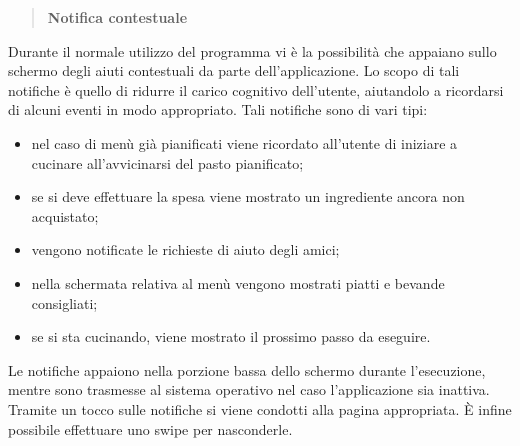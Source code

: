 \begin{quote}
 \textbf{Notifica contestuale}
\end{quote}
Durante il normale utilizzo del programma vi è la possibilità che appaiano sullo schermo degli aiuti contestuali da parte dell'applicazione.
Lo scopo di tali notifiche è quello di ridurre il carico cognitivo dell'utente, aiutandolo a ricordarsi di alcuni eventi in modo appropriato.
Tali notifiche sono di vari tipi: 
\begin{itemize}
 \item nel caso di menù già pianificati viene ricordato all'utente di iniziare a
	 cucinare all'avvicinarsi del pasto pianificato;
 \item se si deve effettuare la spesa viene mostrato un ingrediente ancora non acquistato;
 \item vengono notificate le richieste di aiuto degli amici;
 \item nella schermata relativa al menù vengono mostrati piatti e bevande consigliati;
 \item se si sta cucinando, viene mostrato il prossimo passo da eseguire.
\end{itemize}
Le notifiche appaiono nella porzione bassa dello schermo durante l'esecuzione,
mentre sono trasmesse al sistema operativo nel caso l'applicazione
sia inattiva.  Tramite un tocco sulle notifiche si viene condotti alla pagina
appropriata. È infine possibile effettuare uno swipe per nasconderle.
